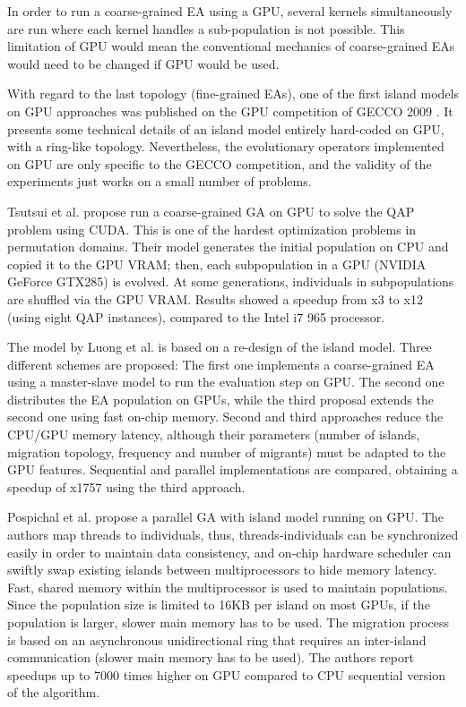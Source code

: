 \documentclass[prodmode,acmtecs]{acmsmall}
\begin{document}
In order to run a coarse-grained EA using a GPU, several kernels simultaneously are run where each kernel handles a sub-population is not possible. This limitation of GPU would mean the conventional mechanics of coarse-grained EAs would need to be changed if GPU would be used.

With regard to the last topology (fine-grained EAs), one of the first island models on GPU approaches was published on the GPU competition of GECCO 2009 \cite{gecco2009CompetitionPospichal}. It presents some technical details of an island model entirely hard-coded on GPU, with a ring-like topology. Nevertheless, the evolutionary operators implemented on GPU are only specific to the GECCO competition, and the validity of the experiments just works on a small number of problems.

Tsutsui et al. \cite{1570355} propose run a coarse-grained GA on GPU to solve the QAP problem using CUDA. This is one of the hardest optimization problems in permutation domains. 
Their model generates the initial population on CPU and copied it to the GPU VRAM; then, each subpopulation in a GPU (NVIDIA GeForce GTX285) is evolved. At some generations, individuals in subpopulations are shuffled via the GPU VRAM. 
Results showed a speedup from x3 to x12 (using eight QAP instances), compared to the Intel i7 965 processor. 

The model by Luong et al. \cite{LUONG:2010:INRIA-00520464:1} is based on a re-design of the island model.
Three different schemes are proposed: The first one implements a coarse-grained EA using a master-slave model to run the evaluation step on GPU. The second one distributes the EA population on GPUs, while the third proposal extends the second one using fast on-chip memory. 
Second and third approaches reduce the CPU/GPU memory latency, although their parameters (number of islands, migration topology, frequency and number of migrants) must be adapted to the GPU features. 
Sequential and parallel implementations are compared, obtaining a speedup of x1757 using the third approach.

Pospichal et al. \cite{pospichalParallelGeneticAlgorithOnCUDA2010,9253} propose a parallel GA with island model running on GPU. The authors map threads to individuals, thus, threads-individuals can be synchronized easily in order to maintain data consistency, and on-chip hardware scheduler can swiftly swap existing islands between multiprocessors to hide memory latency. Fast, shared memory within the multiprocessor is used to maintain populations.
Since the population size is limited to 16KB per island on most GPUs, if the population is larger, slower main memory has to be used. The migration process is based on an asynchronous unidirectional ring that requires an inter-island communication (slower main memory has to be used). The authors report speedups up to 7000 times higher on GPU compared to CPU sequential version of the algorithm.
\end{document}
